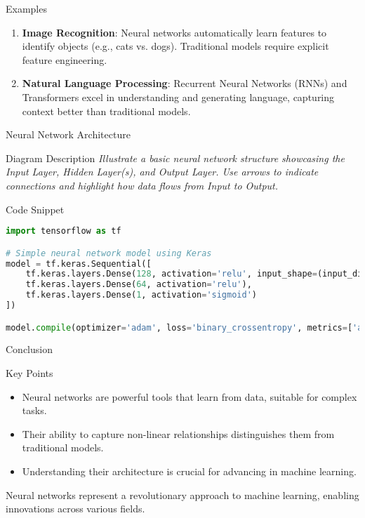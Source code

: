 \documentclass[aspectratio=169]{beamer}
\begin{document}
\begin{frame}{Examples}
    \begin{enumerate}
        \item \textbf{Image Recognition}: 
        Neural networks automatically learn features to identify objects (e.g., cats vs. dogs). Traditional models require explicit feature engineering.
        
        \item \textbf{Natural Language Processing}:
        Recurrent Neural Networks (RNNs) and Transformers excel in understanding and generating language, capturing context better than traditional models.
    \end{enumerate}
\end{frame}

\begin{frame}{Neural Network Architecture}
    \begin{block}{Diagram Description}
        \textit{Illustrate a basic neural network structure showcasing the Input Layer, Hidden Layer(s), and Output Layer. Use arrows to indicate connections and highlight how data flows from Input to Output.}
    \end{block}
\end{frame}

\begin{frame}[fragile]{Code Snippet}
    \begin{lstlisting}[language=Python]
import tensorflow as tf

# Simple neural network model using Keras
model = tf.keras.Sequential([
    tf.keras.layers.Dense(128, activation='relu', input_shape=(input_dim,)),
    tf.keras.layers.Dense(64, activation='relu'),
    tf.keras.layers.Dense(1, activation='sigmoid')
])

model.compile(optimizer='adam', loss='binary_crossentropy', metrics=['accuracy'])
    \end{lstlisting}
\end{frame}

\begin{frame}{Conclusion}
    \begin{block}{Key Points}
        \begin{itemize}
            \item Neural networks are powerful tools that learn from data, suitable for complex tasks.
            \item Their ability to capture non-linear relationships distinguishes them from traditional models.
            \item Understanding their architecture is crucial for advancing in machine learning.
        \end{itemize}
    \end{block}
    
    Neural networks represent a revolutionary approach to machine learning, enabling innovations across various fields.
\end{frame}
\end{document}
